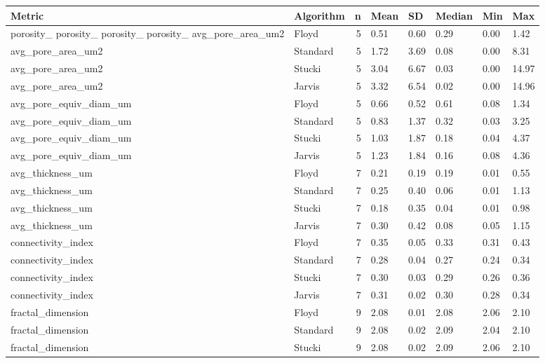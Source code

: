 \begin{tabular}{llrlllll}
\toprule
Metric & Algorithm & n & Mean & SD & Median & Min & Max \\
\midrule
porosity_%
porosity_%
porosity_%
porosity_%
avg_pore_area_um2 & Floyd & 5 & 0.51 & 0.60 & 0.29 & 0.00 & 1.42 \\
avg_pore_area_um2 & Standard & 5 & 1.72 & 3.69 & 0.08 & 0.00 & 8.31 \\
avg_pore_area_um2 & Stucki & 5 & 3.04 & 6.67 & 0.03 & 0.00 & 14.97 \\
avg_pore_area_um2 & Jarvis & 5 & 3.32 & 6.54 & 0.02 & 0.00 & 14.96 \\
avg_pore_equiv_diam_um & Floyd & 5 & 0.66 & 0.52 & 0.61 & 0.08 & 1.34 \\
avg_pore_equiv_diam_um & Standard & 5 & 0.83 & 1.37 & 0.32 & 0.03 & 3.25 \\
avg_pore_equiv_diam_um & Stucki & 5 & 1.03 & 1.87 & 0.18 & 0.04 & 4.37 \\
avg_pore_equiv_diam_um & Jarvis & 5 & 1.23 & 1.84 & 0.16 & 0.08 & 4.36 \\
avg_thickness_um & Floyd & 7 & 0.21 & 0.19 & 0.19 & 0.01 & 0.55 \\
avg_thickness_um & Standard & 7 & 0.25 & 0.40 & 0.06 & 0.01 & 1.13 \\
avg_thickness_um & Stucki & 7 & 0.18 & 0.35 & 0.04 & 0.01 & 0.98 \\
avg_thickness_um & Jarvis & 7 & 0.30 & 0.42 & 0.08 & 0.05 & 1.15 \\
connectivity_index & Floyd & 7 & 0.35 & 0.05 & 0.33 & 0.31 & 0.43 \\
connectivity_index & Standard & 7 & 0.28 & 0.04 & 0.27 & 0.24 & 0.34 \\
connectivity_index & Stucki & 7 & 0.30 & 0.03 & 0.29 & 0.26 & 0.36 \\
connectivity_index & Jarvis & 7 & 0.31 & 0.02 & 0.30 & 0.28 & 0.34 \\
fractal_dimension & Floyd & 9 & 2.08 & 0.01 & 2.08 & 2.06 & 2.10 \\
fractal_dimension & Standard & 9 & 2.08 & 0.02 & 2.09 & 2.04 & 2.10 \\
fractal_dimension & Stucki & 9 & 2.08 & 0.02 & 2.09 & 2.06 & 2.10 \\

\end{tabular}
